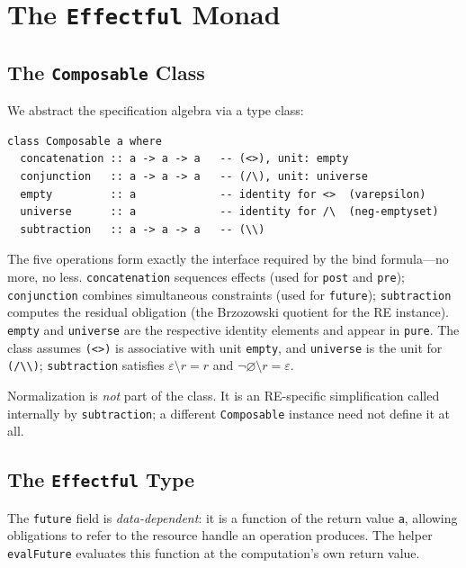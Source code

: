 \documentclass[acmsmall,screen]{acmart}
\newcommand{\univ}{\neg\varnothing}
\begin{document}
\section{The \texttt{Effectful} Monad}
\label{sec:effectful}

\subsection{The \texttt{Composable} Class}

We abstract the specification algebra via a type class:

\begin{lstlisting}
class Composable a where
  concatenation :: a -> a -> a   -- (<>), unit: empty
  conjunction   :: a -> a -> a   -- (/\), unit: universe
  empty         :: a             -- identity for <>  (varepsilon)
  universe      :: a             -- identity for /\  (neg-emptyset)
  subtraction   :: a -> a -> a   -- (\\)
\end{lstlisting}

\noindent
The five operations form exactly the interface required by the bind
formula---no more, no less.
\lstinline{concatenation} sequences effects (used for \lstinline{post}
and \lstinline{pre}); \lstinline{conjunction} combines simultaneous
constraints (used for \lstinline{future}); \lstinline{subtraction}
computes the residual obligation (the Brzozowski quotient for the RE
instance).
\lstinline{empty} and \lstinline{universe} are the respective identity
elements and appear in \lstinline{pure}.
The class assumes \lstinline{(<>)} is associative with unit
\lstinline{empty}, and \lstinline{universe} is the unit for
\lstinline{(/\\)}; \lstinline{subtraction} satisfies
$\varepsilon \setminus r = r$ and $\univ \setminus r = \varepsilon$.

Normalization is \emph{not} part of the class.
It is an RE-specific simplification called internally by
\lstinline{subtraction}; a different \lstinline{Composable} instance
need not define it at all.

\subsection{The \texttt{Effectful} Type}

The \lstinline{future} field is \emph{data-dependent}: it is a function of
the return value \lstinline{a}, allowing obligations to refer to the resource
handle an operation produces.
The helper \lstinline{evalFuture} evaluates this function at the
computation's own return value.
\end{document}
